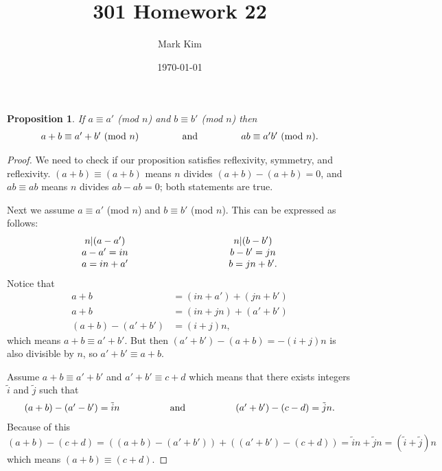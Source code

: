 \documentclass[12pt]{amsart}
\title{301 Homework 22}
\author{Mark Kim}
\date{\today}
\newtheorem*{proposition}{Proposition}
\begin{document}
\maketitle

\begin{proposition}
If $a\equiv a'$ (mod $n$) and $b\equiv b'$ (mod $n$) then
\[
\begin{tabular}{ c c c c c }
$a+b\equiv a' + b'$  (mod $n$) & \hspace{0.75cm} & and & \hspace{0.75cm} & $ab \equiv a'b'$  (mod $n$).
\end{tabular}
\]
\end{proposition}

\begin{proof}
We need to check if our proposition satisfies reflexivity, symmetry, and reflexivity.  $(a+b)\equiv (a+b)$ means $n$ divides $(a+b) - (a+b) = 0$, and $ab\equiv ab$ means $n$ divides $ab-ab=0$; both statements are true.

Next we assume $a\equiv a'$ (mod $n$) and $b\equiv b'$ (mod $n$).  This can be expressed as follows:
\[
\begin{tabular}{ c c c c c }
$n|(a-a')$ & \hspace{1cm} &  & \hspace{1cm} & $n|(b-b')$\\
$a-a' = in$ & \hspace{1cm} & & \hspace{1cm} & $b-b' = jn$\\
$a = in + a'$ & \hspace{1cm} &  & \hspace{1cm} & $b = jn + b'$.
\end{tabular}
\]
Notice that
\begin{align*}
a+b &= (in +a') + (jn + b')\\
a+b &= (in + jn) + (a' + b')\\
(a+b) - (a' + b') &= (i+j)n,
\end{align*}
which means $a+b\equiv a' + b'$.
But then $(a'+b') - (a + b) = -(i+j)n$ is also divisible by $n$, so $a'+b' \equiv a+b$.

Assume $a+b\equiv a' + b'$ and $a' + b' \equiv c+d$ which means that there exists integers $\tilde{i}$ and $\tilde{j}$ such that
\[
\begin{tabular}{ c c c c c }
$(a+b) - (a'-b') = \tilde{i}n$ & \hspace{1cm} & and & \hspace{1cm} & $(a'+b') - (c-d) = \tilde{j}n$.
\end{tabular}
\]
Because of this
\[
(a+b)-(c+d) = ((a+b) - (a' + b')) + ((a' + b')-(c+d)) = \tilde{i}n + \tilde{j}n = (\tilde{i} + \tilde{j})n
\]
which means $(a+b) \equiv (c+d)$.


\end{proof}
\end{document}

